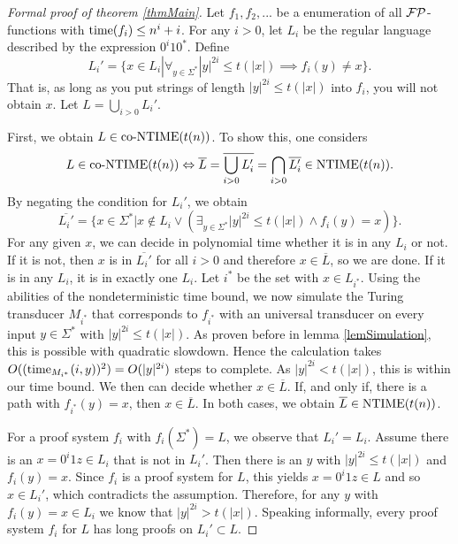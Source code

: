   \begin{proof}[Formal proof of theorem \ref{thmMain}]
    Let \(f_1, f_2, ...\) be a enumeration of all \(\mathcal{FP}\)-functions with \(\operatorname{time}(f_i) \leq n^i + i\).
    For any \(i > 0\), let \(L_i\) be the regular language described by the expression \(0^i10^*\). Define
      \[ L_i' = \{ x \in L_i | \forall_{ y \in \Sigma^* } |y|^{2i} \leq t(|x|) \implies f_i(y) \neq x \}. \]
    That is, as long as you put strings of length \(|y|^{2i} \leq t(|x|)\) into \(f_i\), you will not obtain \(x\).
    Let \(L = \bigcup_{i > 0} L_i'\).

    First, we obtain \(L \in \text{co-NTIME}(t(n))\). To show this, one considers
      \[L \in \text{co-NTIME}(t(n)) \Leftrightarrow \overline{L} = \overline{\bigcup_{i > 0} L_i'} = \bigcap_{i > 0} \overline{L_i'} \in \text{NTIME}(t(n)).\]
    By negating the condition for \(L_i'\), we obtain
      \[ \overline{L_i'} = \{ x \in \Sigma^* | x \notin L_i \vee \left( \exists_{y \in \Sigma^*} |y|^{2i} \leq t(|x|) \wedge f_i(y) = x \right) \}. \]
    For any given \(x\), we can decide in polynomial time whether it is in any \(L_i\) or not. If it is not, then \(x\) is in \(\overline{L_i'}\) for all \(i > 0\) and therefore \(x \in \overline{L}\), so we are done. If it is in any \(L_i\), it is in exactly one \(L_i\). Let \(i^*\) be the set with \(x \in L_{i^*}\). 
    Using the abilities of the nondeterministic time bound, we now simulate the Turing transducer \(M_{i^*}\) that corresponds to \(f_{i^*}\) with an universal transducer on every input \(y \in \Sigma^*\) with \(|y|^{2i} \leq t(|x|)\). As proven before in lemma \ref{lemSimulation}, this is possible with quadratic slowdown. Hence the calculation takes \(O((\operatorname{time}_{M_{i^*}}(i,y))^2) = O(|y|^{2i})\) steps to complete. As \(|y|^{2i} < t(|x|)\), this is within our time bound.
    We then can decide whether \(x \in \overline{L}\). If, and only if, there is a path with \(f_{i^*}(y) = x\), then \(x \in \overline{L}\). In both cases, we obtain \(\overline{L} \in \text{NTIME}(t(n))\).

    For a proof system \(f_i\) with \(f_i(\Sigma^*) = L\), we observe that \(L_i' = L_i\). Assume there is an \(x = 0^i1z \in L_i\) that is not in \(L_i'\). Then there is an \(y\) with \(|y|^{2i} \leq t(|x|)\) and \(f_i(y) = x\). Since \(f_i\) is a proof system for \(L\), this yields \(x = 0^i1z \in L\) and so \(x \in L_i'\), which contradicts the assumption. Therefore, for any \(y\) with \(f_i(y) = x \in L_i\) we know that \(|y|^{2i} > t(|x|)\). Speaking informally, every proof system \(f_i\) for \(L\) has long proofs on \(L_i' \subset L\).


\end{proof}
